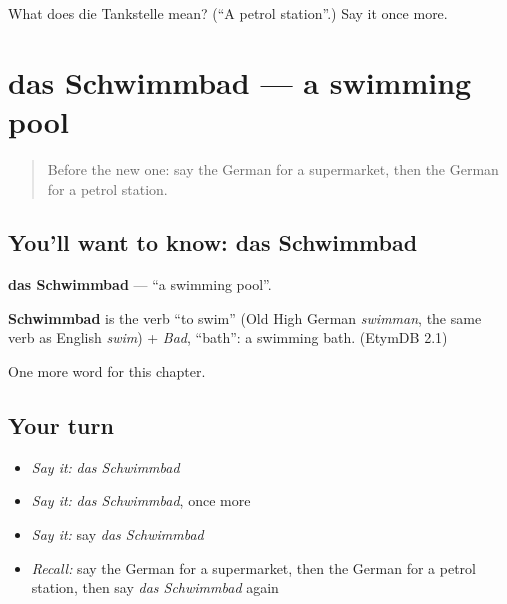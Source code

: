 \begin{tcolorbox}[breakable,colback=teal!4,colframe=teal!35!black,title={Before you move on}]
What does die Tankstelle mean? (\textquotedblleft{}A petrol station\textquotedblright{}.) Say it once more.
\end{tcolorbox}
\section[das Schwimmbad]{das Schwimmbad — a swimming pool}

\label{lesson:GE-C106-schwimmbad}



\begin{quote}
Before the new one: say the German for a supermarket, then the German for a petrol station.
\end{quote}

\subsection*{You'll want to know: das Schwimmbad}
\textbf{das Schwimmbad} — \textquotedblleft{}a swimming pool\textquotedblright{}.

\begin{cousinweb}
\textbf{Schwimmbad} is the verb \textquotedblleft{}to swim\textquotedblright{} (Old High German \emph{swimman}, the same verb as English \emph{swim}) + \emph{Bad}, \textquotedblleft{}bath\textquotedblright{}: a swimming bath. (EtymDB 2.1)
\end{cousinweb}

\begin{grammarlens}[title={What you've built}]
One more word for this chapter.
\end{grammarlens}

\subsection*{Your turn}
\begin{itemize}
\raggedright
  \item \emph{Say it:} \emph{das Schwimmbad}
  \item \emph{Say it:} \emph{das Schwimmbad}, once more
  \item \emph{Say it:} say \emph{das Schwimmbad}
  \item \emph{Recall:} say the German for a supermarket, then the German for a petrol station, then say \emph{das Schwimmbad} again
\end{itemize}

